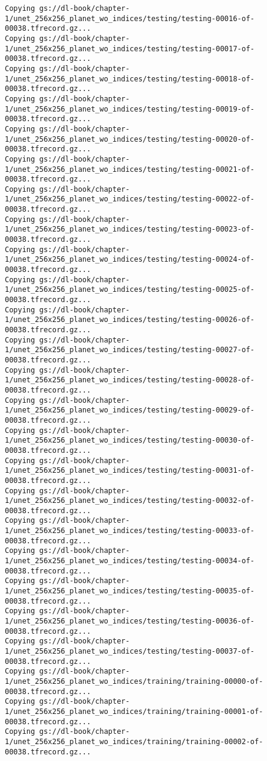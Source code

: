 \documentclass[
  letterpaper,
  DIV=11,
  numbers=noendperiod]{scrreprt}
\begin{document}
\begin{verbatim}
Copying gs://dl-book/chapter-1/unet_256x256_planet_wo_indices/testing/testing-00016-of-00038.tfrecord.gz...
Copying gs://dl-book/chapter-1/unet_256x256_planet_wo_indices/testing/testing-00017-of-00038.tfrecord.gz...
Copying gs://dl-book/chapter-1/unet_256x256_planet_wo_indices/testing/testing-00018-of-00038.tfrecord.gz...
Copying gs://dl-book/chapter-1/unet_256x256_planet_wo_indices/testing/testing-00019-of-00038.tfrecord.gz...
Copying gs://dl-book/chapter-1/unet_256x256_planet_wo_indices/testing/testing-00020-of-00038.tfrecord.gz...
Copying gs://dl-book/chapter-1/unet_256x256_planet_wo_indices/testing/testing-00021-of-00038.tfrecord.gz...
Copying gs://dl-book/chapter-1/unet_256x256_planet_wo_indices/testing/testing-00022-of-00038.tfrecord.gz...
Copying gs://dl-book/chapter-1/unet_256x256_planet_wo_indices/testing/testing-00023-of-00038.tfrecord.gz...
Copying gs://dl-book/chapter-1/unet_256x256_planet_wo_indices/testing/testing-00024-of-00038.tfrecord.gz...
Copying gs://dl-book/chapter-1/unet_256x256_planet_wo_indices/testing/testing-00025-of-00038.tfrecord.gz...
Copying gs://dl-book/chapter-1/unet_256x256_planet_wo_indices/testing/testing-00026-of-00038.tfrecord.gz...
Copying gs://dl-book/chapter-1/unet_256x256_planet_wo_indices/testing/testing-00027-of-00038.tfrecord.gz...
Copying gs://dl-book/chapter-1/unet_256x256_planet_wo_indices/testing/testing-00028-of-00038.tfrecord.gz...
Copying gs://dl-book/chapter-1/unet_256x256_planet_wo_indices/testing/testing-00029-of-00038.tfrecord.gz...
Copying gs://dl-book/chapter-1/unet_256x256_planet_wo_indices/testing/testing-00030-of-00038.tfrecord.gz...
Copying gs://dl-book/chapter-1/unet_256x256_planet_wo_indices/testing/testing-00031-of-00038.tfrecord.gz...
Copying gs://dl-book/chapter-1/unet_256x256_planet_wo_indices/testing/testing-00032-of-00038.tfrecord.gz...
Copying gs://dl-book/chapter-1/unet_256x256_planet_wo_indices/testing/testing-00033-of-00038.tfrecord.gz...
Copying gs://dl-book/chapter-1/unet_256x256_planet_wo_indices/testing/testing-00034-of-00038.tfrecord.gz...
Copying gs://dl-book/chapter-1/unet_256x256_planet_wo_indices/testing/testing-00035-of-00038.tfrecord.gz...
Copying gs://dl-book/chapter-1/unet_256x256_planet_wo_indices/testing/testing-00036-of-00038.tfrecord.gz...
Copying gs://dl-book/chapter-1/unet_256x256_planet_wo_indices/testing/testing-00037-of-00038.tfrecord.gz...
Copying gs://dl-book/chapter-1/unet_256x256_planet_wo_indices/training/training-00000-of-00038.tfrecord.gz...
Copying gs://dl-book/chapter-1/unet_256x256_planet_wo_indices/training/training-00001-of-00038.tfrecord.gz...
Copying gs://dl-book/chapter-1/unet_256x256_planet_wo_indices/training/training-00002-of-00038.tfrecord.gz...

\end{verbatim}
\end{document}
